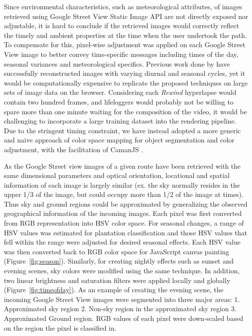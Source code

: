 \documentclass{sigchi}
\begin{document}
Since environmental characteristics, such as meteorological attributes, of images retrieved using Google Street View Static Image API are not directly exposed nor adjustable, it is hard to conclude if the retrieved images would correctly reflect the timely and ambient properties at the time when the user undertook the path. To compensate for this, pixel-wise adjustment was applied on each Google Street View image to better convey time-specific messages including times of the day, seasonal variances and meteorological specifics. Previous work done by \cite{laffont2014transient,shih2013data} have successfully reconstructed images with varying diurnal and seasonal cycles, yet it would be computationally expensive to replicate the proposed techniques on large sets of image data on the browser. Considering each \textit{Rewind} hyperlapse would contain two hundred frames, and lifeloggers would probably not be willing to spare more than one minute waiting for the composition of the video, it would be challenging to incorporate a large training dataset into the rendering pipeline. Due to the stringent timing constraint, we have instead adopted a more generic and naive approach of color space mapping for object segmentation and color adjustment, with the facilitation of CamanJS \cite{caman}.

As the Google Street view images of a given route have been retrieved with the same dimensional parameters and optical orientation, locational and spatial information of each image is largely similar (ex. the sky normally resides in the upper 1/3 of the image, but could occupy more than 1/2 of the image at times). Thus sky and ground regions could be approximated by generalizing the observed geographical information of the incoming images. Each pixel was first converted from RGB representation into HSV color space. For seasonal changes, a range of HSV values was estimated for plantation classification and those HSV values that fell within the range were adjusted for desired seasonal effects. Each HSV value was then converted back to RGB color space for JavaScript canvas painting (Figure~\ref{fig:season}). Similarly, for creating nightly effects such as sunset and evening scenes, sky colors were modified using the same technique. In addition, two linear brightness and saturation filters were applied locally and globally (Figure~\ref{fig:timeofday}). As an example of creating the evening scene, the incoming Google Street View images were segmented into three major areas: 1. Approximated sky region 2. Non-sky region in the approximated sky region 3. Approximated Ground region. RGB values of each pixel were down-scaled based on the region the pixel is classified in. 
\end{document}
